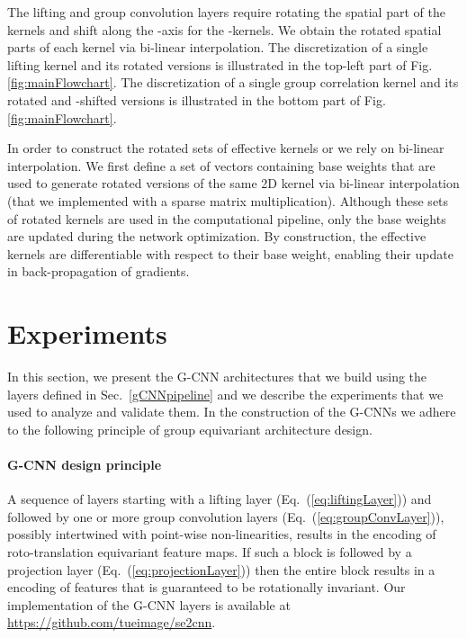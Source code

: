 \documentclass[twocolumn,final]{article}
\begin{document}
The lifting and group convolution layers require rotating the spatial part of the kernels and shift along the -axis for the -kernels.
We obtain the rotated spatial parts of each kernel via bi-linear interpolation.
The discretization of a single lifting kernel  and its  rotated versions is illustrated in the top-left part of Fig.\ref{fig:mainFlowchart}.
The discretization of a single group correlation kernel  and its  rotated and -shifted versions is illustrated in the bottom part of Fig.\ref{fig:mainFlowchart}.

In order to construct the rotated sets of effective kernels  or  we rely on bi-linear interpolation. We first define a set of vectors containing base weights that are used to generate rotated versions of the same 2D kernel via bi-linear interpolation (that we implemented with a sparse matrix multiplication).
Although these sets of rotated kernels are used in the computational pipeline, only the base weights are updated during the network optimization.
By construction, the effective kernels are differentiable with respect to their base weight, enabling their update in back-propagation of gradients.

\section{Experiments}
\label{sec:experiments}
In this section, we present the G-CNN architectures that we build using the layers defined in Sec.~\ref{gCNNpipeline} and we describe the experiments that we used to analyze and validate them. In the construction of the G-CNNs we adhere to the following principle of group equivariant architecture design. 

\paragraph{G-CNN design principle} A sequence of layers starting with a lifting layer (Eq.~(\ref{eq:liftingLayer})) and followed by one or more group convolution layers (Eq.~(\ref{eq:groupConvLayer})), possibly intertwined with point-wise non-linearities, results in the encoding of roto-translation equivariant feature maps.
If such a block is followed by a projection layer (Eq.~(\ref{eq:projectionLayer})) then the entire block results in a encoding of features that is guaranteed to be rotationally invariant.
Our implementation of the G-CNN layers is available at \url{https://github.com/tueimage/se2cnn}.
\end{document}
